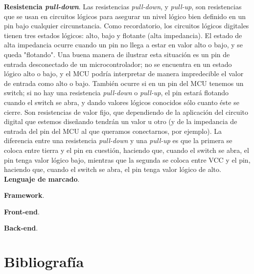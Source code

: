 \documentclass[12pt]{article}
\begin{document}
	\noindent \textbf{\large Resistencia \textit{pull-down}}. Las resistencias \textit{pull-down}, y \textit{pull-up}, son resistencias que se usan en circuitos lógicos para asegurar un nivel lógico bien definido en un pin bajo cualquier circunstancia. Como recordatorio, los circuitos lógicos digitales tienen tres estados lógicos: alto, bajo y flotante (alta impedancia). El estado de alta impedancia ocurre cuando un pin no llega a estar en valor alto o bajo, y se queda "flotando". Una buena manera de ilustrar esta situación es un pin de entrada desconectado de un microcontrolador; no se encuentra en un estado lógico alto o bajo, y el MCU podría interpretar de manera impredecible el valor de entrada como alto o bajo. También ocurre si en un pin del MCU tenemos un switch; si no hay una resistencia \textit{pull-down} o \textit{pull-up}, el pin estará flotando cuando el switch se abra, y dando valores lógicos conocidos sólo cuanto éste se cierre. Son resistencias de valor fijo, que dependiendo de la aplicación del circuito digital que estemos diseñando tendrán un valor u otro (y de la impedancia de entrada del pin del MCU al que queramos conectarnos, por ejemplo). La diferencia entre una resistencia \textit{pull-down} y una \textit{pull-up} es que la primera se coloca entre tierra y el pin en cuestión, haciendo que, cuando el switch se abra, el pin tenga valor lógico bajo, mientras que la segunda se coloca entre VCC y el pin, haciendo que, cuando el switch se abra, el pin tenga valor lógico de alto.\\ 
	
	\noindent \textbf{\large Lenguaje de marcado}.
	
	\noindent \textbf{\large Framework}. 
	
	\noindent \textbf{\large Front-end}.
	
	\noindent \textbf{\large Back-end}.  
	
	\pagebreak
	
	\section*{Bibliografía}
	
\end{document}
